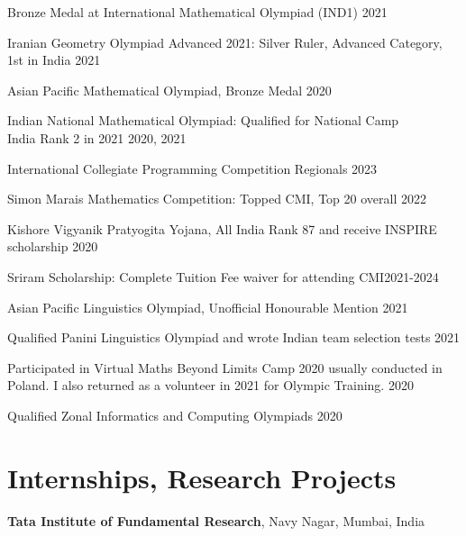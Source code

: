 \documentclass[margin,line, 10pt]{res}
\begin{document}
\begin{resume}
\vspace*{-2.5mm}
Bronze Medal at International Mathematical Olympiad (IND1) \hfill 2021

\vspace*{-2.5mm}
Iranian Geometry Olympiad Advanced 2021: Silver Ruler, Advanced Category, 1st in India \hfill 2021

\vspace*{-2.5mm}
Asian Pacific Mathematical Olympiad, Bronze Medal \hfill 2020

\vspace*{-2.5mm}
Indian National Mathematical Olympiad: Qualified for National Camp\\ India Rank 2 in 2021 \hfill 2020, 2021

\vspace*{-2.5mm}
International Collegiate Programming Competition Regionals \hfill 2023
 
\vspace*{-2.5mm}
Simon Marais Mathematics Competition: Topped CMI, Top 20 overall \hfill 2022

\vspace*{-2.5mm}
Kishore Vigyanik Pratyogita Yojana, All India Rank 87 and receive INSPIRE scholarship \hfill 2020

\vspace*{-2.5mm}
Sriram Scholarship: Complete Tuition Fee waiver for attending CMI\hfill 2021-2024

\vspace*{-2.5mm}
Asian Pacific Linguistics Olympiad, Unofficial Honourable Mention \hfill 2021

\vspace*{-2.5mm}
Qualified Panini Linguistics Olympiad and wrote Indian team selection tests \hfill{2021}

\vspace*{-2.5mm}
Participated in Virtual Maths Beyond Limits Camp 2020 usually conducted in Poland. I also returned as a volunteer in 2021 for Olympic Training. \hfill 2020

\vspace*{-2.5mm}
Qualified Zonal Informatics and Computing Olympiads \hfill 2020
\section{\sc Internships, Research Projects}
{\bf Tata Institute of Fundamental Research}, Navy Nagar, Mumbai, India


\end{resume}
\end{document}

